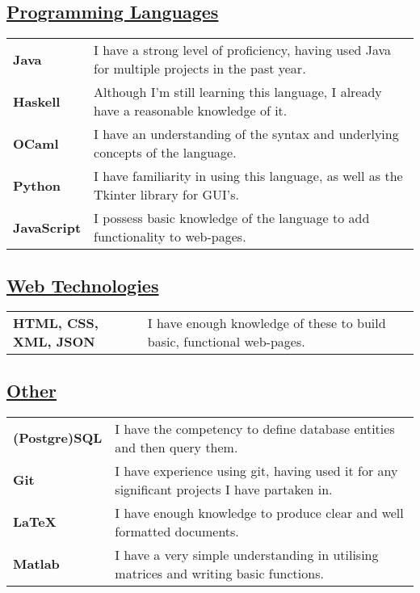 \documentclass[11pt]{article}
\begin{document}
		\subsection*{\underline{Programming Languages}}
		\renewcommand{\arraystretch}{1.3}%
		\begin{tabular}[20pt]{ll}
			 \textbf{Java} &  I have a strong level of proficiency, having used Java for multiple projects in the past year.\\
			 \textbf{Haskell} & Although I'm still learning this language, I already have a reasonable knowledge of it.\\
			 \textbf{OCaml} & I have an understanding of the syntax and underlying concepts of the language.\\
			 \textbf{Python} & I have familiarity in using this language, as well as the Tkinter library for GUI's. \\
			\textbf{JavaScript} &  I possess basic knowledge of the language to add functionality to web-pages.\\
		\end{tabular} 
		\subsection*{\underline{Web Technologies}}
		\renewcommand{\arraystretch}{1.3}%
		\begin{tabular}{ll}
			\textbf{HTML, CSS, XML, JSON} & I have enough knowledge of these to build basic, functional web-pages.\\
		\end{tabular}
		\subsection*{\underline{Other}}
		\renewcommand{\arraystretch}{1.3}%
		\begin{tabular}{ll}
			\textbf{(Postgre)SQL} & I have the competency to define database entities and then query them.\\
			 \textbf{Git} & I have experience using git, having used it for any significant projects I have partaken in.\\
			\textbf{LaTeX} & I have enough knowledge to produce clear and well formatted documents.\\
			\textbf{Matlab} & I have a very simple understanding in utilising matrices and writing basic functions.\\
		\end{tabular}
	
\end{document}
